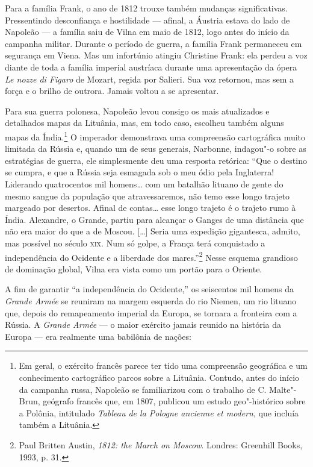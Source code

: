 Para a família Frank, o ano de 1812 trouxe também mudanças
significativas. Pressentindo desconfiança e hostilidade --- afinal, a
Áustria estava do lado de Napoleão --- a família saiu de Vilna em maio de
1812, logo antes do início da campanha militar. Durante o período de
guerra, a família Frank permaneceu em segurança em Viena. Mas um
infortúnio atingiu Christine Frank: ela perdeu a voz diante de toda a
família imperial austríaca durante uma apresentação da ópera \textit{Le
nozze di Figaro} de Mozart, regida por Salieri. Sua voz retornou, mas
sem a força e o brilho de outrora. Jamais voltou a se apresentar.

\asterisc

Para sua guerra polonesa, Napoleão levou consigo os mais atualizados e
detalhados mapas da Lituânia, mas, em todo caso, escolheu também alguns
mapas da Índia.\footnote{Em geral, o exército francês parece ter tido uma compreensão geográfica e um conhecimento cartográfico parcos sobre a Lituânia. Contudo, antes do início da campanha russa, Napoleão se familiarizou com o trabalho de C. Malte"-Brun, geógrafo francês que, em 1807, publicou um estudo geo"-histórico sobre a Polônia, intitulado \textit{Tableau de la Pologne ancienne et modern}, que incluía também a Lituânia.} O imperador demonstrava uma compreensão cartográfica muito limitada da Rússia e, quando um de seus generais, Narbonne, indagou"-o
sobre as estratégias de guerra, ele simplesmente deu uma resposta
retórica: ``Que o destino se cumpra, e que a Rússia seja esmagada sob o
meu ódio pela Inglaterra! Liderando quatrocentos mil homens\ldots{} com
um batalhão lituano de gente do mesmo sangue da população que
atravessaremos, não temo esse longo trajeto margeado por desertos.
Afinal de contas\ldots{} esse longo trajeto é o trajeto rumo à Índia.
Alexandre, o Grande, partiu para alcançar o Ganges de uma distância que
não era maior do que a de Moscou. [\ldots{}] Seria uma expedição
gigantesca, admito, mas possível no século \textsc{xix}. Num só golpe, a França
terá conquistado a independência do Ocidente e a liberdade dos
mares.''\footnote{Paul Britten Austin, \textit{1812: the March on Moscow}. Londres: Greenhill Books, 1993, p. 31.} Nesse esquema grandioso de dominação global, Vilna era vista como um portão
para o Oriente.

A fim de garantir ``a independência do Ocidente,'' os seiscentos mil
homens da \textit{Grande Armée} se reuniram na margem esquerda do rio
Niemen, um rio lituano que, depois do remapeamento imperial da Europa,
se tornara a fronteira com a Rússia. A \textit{Grande Armée} --- o maior
exército jamais reunido na história da Europa --- era realmente uma
babilônia de nações:

